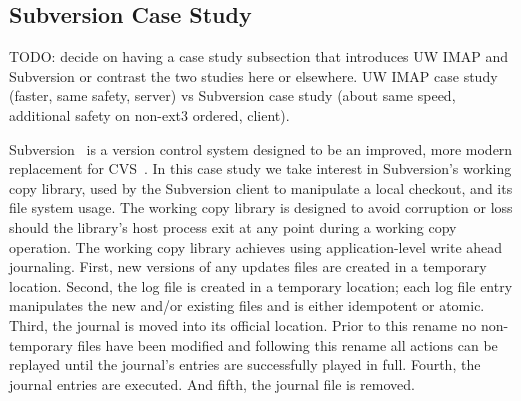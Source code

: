 \subsection{Subversion Case Study}
\label{sec:opgroup:svn}

TODO: decide on having a case study subsection that introduces UW IMAP
and Subversion or contrast the two studies here or elsewhere.
%
UW IMAP case study (faster, same safety, server) vs
Subversion case study (about same speed, additional safety on non-ext3
ordered, client).

Subversion~\cite{svn} is a version control system designed to be an
improved, more modern replacement for CVS~\cite{cvs}. In this case
study we take interest in Subversion's working copy library, used by
the Subversion client to manipulate a local checkout, and its file
system usage.
%
The working copy library is designed to avoid corruption or loss
should the library's host process exit at any point during a working
copy operation. The working copy library achieves using
application-level write ahead journaling.
%
First, new versions of any updates files are created in a temporary
location. Second, the log file is created in a temporary location;
each log file entry manipulates the new and/or existing files and is
either idempotent or atomic. Third, the journal is moved into its
official location. Prior to this rename no non-temporary files have
been modified and following this rename all actions can be replayed
until the journal's entries are successfully played in full. Fourth,
the journal entries are executed.  And fifth, the journal file is
removed.

